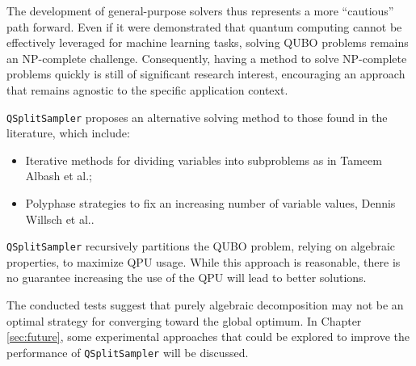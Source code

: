 The development of general-purpose solvers thus represents a more ``cautious'' path forward. 
Even if it were demonstrated that quantum computing cannot be effectively leveraged for machine learning tasks, solving QUBO problems remains an NP-complete challenge. 
Consequently, having a method to solve NP-complete problems quickly is still of significant research interest, encouraging an approach that remains agnostic to the specific application context.

\texttt{QSplitSampler} proposes an alternative solving method to those found in the literature, which include:
\begin{itemize}
    \item Iterative methods for dividing variables into subproblems as in Tameem Albash et al.\cite{subqubo2};
    \item Polyphase strategies to fix an increasing number of variable values, Dennis Willsch et al.\cite{subqubo1}.
\end{itemize}

\texttt{QSplitSampler} recursively partitions the QUBO problem, relying on algebraic properties, to maximize QPU usage. 
While this approach is reasonable, there is no guarantee increasing the use of the QPU will lead to better solutions.

The conducted tests suggest that purely algebraic decomposition may not be an optimal strategy for converging toward the global optimum. 
In Chapter \ref{sec:future}, some experimental approaches that could be explored to improve the performance of \texttt{QSplitSampler} will be discussed.